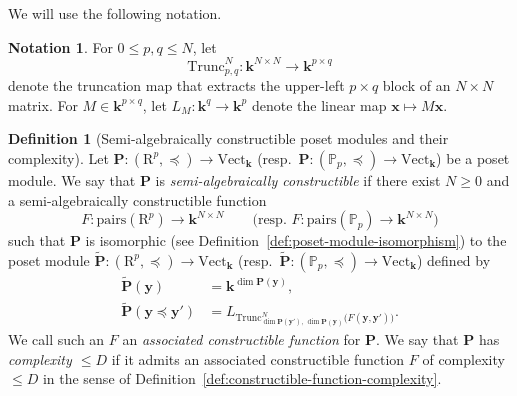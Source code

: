 \documentclass{amsart}[10pts]
\theoremstyle{definition}
\newtheorem{definition}{Definition}[section]
\newtheorem{notation}{Notation}[section]
\theoremstyle{remark}
\theoremstyle{observation}
\numberwithin{equation}{section}
\newcommand {\R} {\mathrm{R}}
\newcommand {\kk}         {\mathbf{k}}
\newcommand {\PP}     {\mathbb{P}} %
\newcommand{\x}{\mathbf{x}}
\newcommand{\y}{\mathbf{y}}
\newcommand{\Pairs}{\mathrm{pairs}}
\newcommand{\Vect}{\mathrm{Vect}}
\newcommand{\Trunc}{\mathrm{Trunc}}
\begin{document}
\medskip
We will use the following notation.

\begin{notation}
\label{not:matrix}
For $0\le p,q\le N$, let
\[
\Trunc_{p,q}^{N}:\kk^{N\times N}\to \kk^{p\times q}
\]
denote the truncation map that extracts the upper-left $p\times q$ block of an $N\times N$ matrix.
For $M\in \kk^{p\times q}$, let $L_M:\kk^{q}\to \kk^{p}$ denote the linear map $\x\mapsto M\x$.
\end{notation}

\begin{definition}[Semi-algebraically constructible poset modules and their complexity]
\label{def:constructible-poset-module}
Let $\mathbf P:(\R^p,\preceq)\to \Vect_{\kk}$ (resp.\ $\mathbf P:(\PP_p,\preceq)\to \Vect_{\kk}$) be a poset module.
We say that $\mathbf P$ is \emph{semi-algebraically constructible} if there exist $N\ge 0$ and a semi-algebraically constructible function
\[
F:\Pairs(\R^p)\to \kk^{N\times N}
\qquad\text{(resp.\ $F:\Pairs(\PP_p)\to \kk^{N\times N}$)}
\]
such that $\mathbf P$ is isomorphic (see Definition~\ref{def:poset-module-isomorphism}) to the poset module
$\widetilde{\mathbf P}:(\R^p,\preceq)\to \Vect_{\kk}$ (resp.\ $\widetilde{\mathbf P}:(\PP_p,\preceq)\to \Vect_{\kk}$) defined by
\begin{align*}
\widetilde{\mathbf P}(\y) &= \kk^{\dim \mathbf P(\y)},\\
\widetilde{\mathbf P}(\y\preceq \y') &=
L_{\Trunc^{N}_{\dim \mathbf P(\y'),\,\dim \mathbf P(\y)}\bigl(F(\y,\y')\bigr)}.
\end{align*}
We call such an $F$ an \emph{associated constructible function} for $\mathbf P$.
We say that $\mathbf P$ has \emph{complexity $\le D$} if it admits an associated constructible function $F$ of complexity $\le D$ in the sense of Definition~\ref{def:constructible-function-complexity}.
\end{definition}
\end{document}
